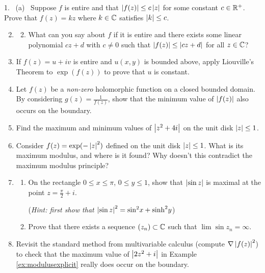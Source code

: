  
\begin{exercises}
	\hangindent\doubleind
	\textup{1.} \ (a) \ Suppose $f$ is entire and that $\left| f(z)\right|\le c\left| z\right|$ for some constant $c\in\mathbb{R}^+$. Prove that $f(z)=kz$ where $k\in\mathbb{C}$ satisfies $\left| k\right|\le c$.
	
	\begin{enumerate}\setcounter{enumi}{1} 
	  \item[]\begin{enumerate}\setcounter{enumii}{1} 
	    \item What can you say about $f$ if it is entire and there exists some linear polynomial $cz+d$ with $c\neq 0$ such that $\left| f(z)\right|\le\left| cz+d\right|$ for all $z\in\mathbb{C}$?
	  \end{enumerate}
	  
	  
	  \item If $f(z)=u+iv$ is entire and $u(x,y)$ is bounded above, apply Liouville's Theorem to $\exp(f(z))$ to prove that $u$ is constant.
	  
	  
	  \item Let $f(z)$ be a \emph{non-zero} holomorphic function on a closed bounded domain. By considering $g(z)=\frac 1{f(z)}$, show that the minimum value of $\left| f(z)\right|$ also occurs on the boundary.
	  
	  
	  \item Find the maximum and minimum values of $\left| z^2+4i\right|$ on the unit disk $\left| z\right|\le 1$.
	  
	  
	  \item\label{exs:nonholomaxmod} Consider $f(z)=\exp(-\left| z\right|^2)$ defined on the unit disk $\left| z\right|\le 1$. What is its maximum modulus, and where is it found? Why doesn't this contradict the maximum modulus principle?
	  
	  
	  \item\begin{enumerate}
	    \item On the rectangle $0\le x\le\pi$, $0\le y\le 1$, show that $\left| \sin z\right|$ is maximal at the point $z=\frac\pi 2+i$.\par
	  	(\emph{Hint: first show that $\left| \sin z\right|^2=\sin^2\!x+\sinh^2\!y$})
	  	\item Prove that there exists a sequence $(z_n)\subset\mathbb{C}$ such that $\lim\sin z_n=\infty$.
	  \end{enumerate} 
	  
	  
	  \item Revisit the standard method from multivariable calculus (compute $\nabla\left| f(z)\right|^2$) to check that the maximum value of $\left| 2z^2+i\right|$ in Example \ref{ex:modulusexplicit} really does occur on the boundary.
	

\end{enumerate}
\end{exercises}
